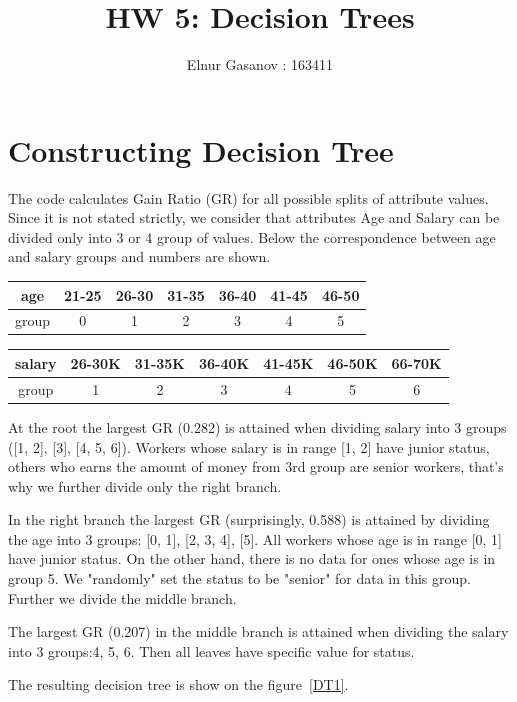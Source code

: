 \documentclass{article}
\author{Elnur Gasanov : 163411}
\title{HW 5: Decision Trees}
\begin{document}
\maketitle

\section{Constructing Decision Tree}

The code calculates Gain Ratio (GR) for all possible splits of attribute values. Since it is not stated strictly, we consider that attributes Age and Salary can be divided only into 3 or 4 group of values. Below the correspondence between age and salary groups and numbers are shown.

\begin{tabular}{|c|c|c|c|c|c|c|}
	\hline
	age & 21-25 & 26-30 & 31-35 & 36-40 & 41-45 & 46-50 \\
	\hline
	group & 0 & 1 & 2 & 3 & 4 & 5 \\
	\hline
\end{tabular}

\begin{tabular}{|c|c|c|c|c|c|c|}
	\hline
	salary & 26-30K & 31-35K & 36-40K & 41-45K & 46-50K & 66-70K \\
	\hline
	group & 1 & 2 & 3 & 4 & 5 & 6 \\
	\hline
\end{tabular}

At the root the largest GR (0.282) is attained when dividing salary into 3 groups ([1, 2], [3], [4, 5, 6]). Workers whose salary is in range [1, 2] have junior status, others who earns the amount of money from 3rd group are senior workers, that's why we further divide only the right branch.

In the right branch the largest GR (surprisingly, 0.588) is attained by dividing the age into 3 groups: [0, 1], [2, 3, 4], [5]. All workers whose age is in range [0, 1] have junior status. On the other hand, there is no data for ones whose age is in group 5. We "randomly" set the status to be "senior" for data in this group. Further we divide the middle branch.

The largest GR (0.207) in the middle branch is attained when dividing the salary into 3 groups:4, 5, 6. Then all leaves have specific value for status. 

The resulting decision tree is show on the figure~\ref{DT1}.
\end{document}
